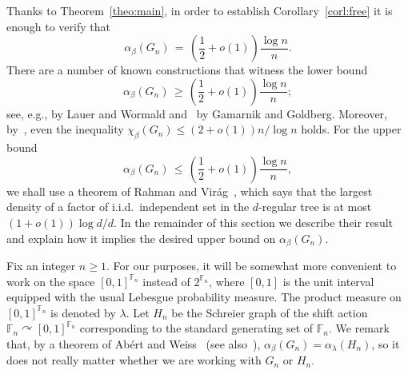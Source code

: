\documentclass[AHL,Unicode,longabstracts,published]{cedram}
\newcommand{\0}{\varnothing}
\renewcommand{\leq}{\leqslant}
\renewcommand{\geq}{\geqslant}
\newcommand{\F}{\mathbb{F}}
\begin{document}
Thanks to Theorem~\ref{theo:main}, in order to establish Corollary~\ref{corl:free} it is enough to verify that
\[
\alpha_\beta\left(G_n\right) \,=\, \left(\frac{1}{2} + o(1)\right) \frac{\log n}{n}.
\]
There are a number of known constructions that witness the lower bound
\[
\alpha_\beta\left(G_n\right) \,\geq\, \left(\frac{1}{2} + o(1)\right) \frac{\log n}{n};
\]
see, e.g., \cite{LW} by Lauer and Wormald and~\cite{GG} by Gamarnik and Goldberg. Moreover, by~\cite[Corollary~1.2]{Ber}, even the inequality $\chi_\beta(G_n) \leq (2+o(1))n/\log n$ holds. For the upper bound
\begin{equation}\label{eq:upper}
\alpha_\beta(G_n) \,\leq\, \left(\frac{1}{2} + o(1)\right)\frac{\log n}{n},
\end{equation}
we shall use a theorem of Rahman and Virág~\cite{RV}, which says that the largest density of a factor of i.i.d.~independent set in the $d$-regular tree is at most $(1+o(1))\log d/d$. In the remainder of this section we describe their result and explain how it implies the desired upper bound on $\alpha_\beta(G_n)$.

Fix an integer $n \geq 1$. For our purposes, it will be somewhat more convenient to work on the space $[0,1]^{\F_n}$ instead of $2^{\F_n}$, where $[0,1]$ is the unit interval equipped with the usual Lebesgue probability measure. The product measure on $[0,1]^{\F_n}$ is denoted by $\lambda$. Let $H_n$ be the Schreier graph of the shift action $\F_n \curvearrowright [0,1]^{\F_n}$ corresponding to the standard generating set of $\F_n$. We remark that, by a theorem of Abért and Weiss~\cite{AW} (see also~\cite[Theorem~6.46]{KechrisMarks}), $\alpha_\beta(G_n) = \alpha_\lambda(H_n)$, so it does not really matter whether we are working with $G_n$ or $H_n$.
\end{document}
